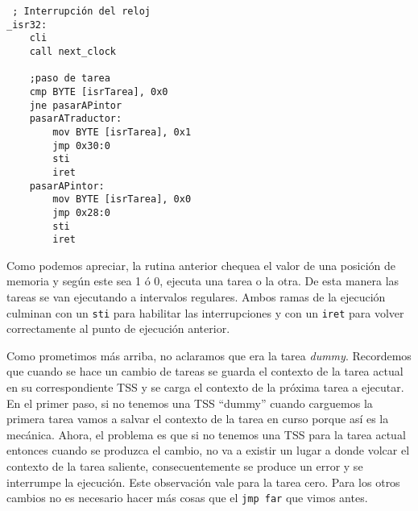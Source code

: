 \begin{verbatim}
 ; Interrupción del reloj
_isr32:    
    cli
    call next_clock
    
    ;paso de tarea
    cmp BYTE [isrTarea], 0x0
    jne pasarAPintor    
    pasarATraductor:
        mov BYTE [isrTarea], 0x1
        jmp 0x30:0
        sti
        iret
    pasarAPintor:
        mov BYTE [isrTarea], 0x0
        jmp 0x28:0
        sti
        iret
\end{verbatim}

Como podemos apreciar, la rutina anterior chequea el valor de una posición de memoria y según este sea 1 ó 0, ejecuta una tarea o la otra. De esta manera las tareas se van ejecutando a intervalos regulares. Ambos ramas de la ejecución culminan con un \texttt{sti} para habilitar las interrupciones y con un \texttt{iret} para volver correctamente al punto de ejecución anterior. 

Como prometimos más arriba, no aclaramos que era la tarea \emph{dummy}. Recordemos que cuando se hace un cambio de tareas se guarda el contexto de la tarea actual en su correspondiente TSS y se carga el contexto de la próxima tarea a ejecutar. En el primer paso, si no tenemos una TSS ``dummy'' cuando carguemos la primera tarea vamos a salvar el contexto de la tarea en curso porque así es la mecánica. Ahora, el problema es que si no tenemos una TSS para la tarea actual entonces cuando se produzca el cambio, no va a existir un lugar a donde volcar el contexto de la tarea saliente, consecuentemente se produce un error y se interrumpe la ejecución. Este observación vale para la tarea cero. Para los otros cambios no es necesario hacer más cosas que el \texttt{jmp far} que vimos antes.